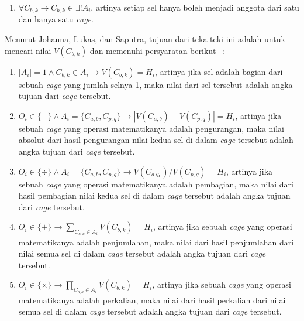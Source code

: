 \documentclass[a4paper,twoside]{article}
\begin{document}
\begin{enumerate}
\begin{enumerate}
\item \begin{math}\forall C_{b,k} \rightarrow C_{b,k} \in \exists! A_i\end{math}, artinya setiap sel hanya boleh menjadi anggota dari satu dan hanya satu \textit{cage}.
\end{enumerate}
Menurut Johanna, Lukas, dan Saputra, tujuan dari teka-teki ini adalah untuk mencari nilai \begin{math}V(C_{b,k})\end{math} dan memenuhi persyaratan berikut ~\cite{JohannaLukasSaputra}:
\begin{enumerate}
\item \begin{math}|A_i| = 1 \land C_{b,k} \in A_i \rightarrow V(C_{b,k}) = H_i\end{math}, artinya jika sel adalah bagian dari sebuah \textit{cage} yang jumlah selnya 1, maka nilai dari sel tersebut adalah angka tujuan dari \textit{cage} tersebut.
\item \begin{math}O_i \in \{-\} \land A_i = \{C_{a,b}, C_{p,q}\} \rightarrow |V(C_{a,b}) - V(C_{p,q})| = H_i\end{math}, artinya jika sebuah \textit{cage} yang operasi matematikanya adalah pengurangan, maka nilai absolut dari hasil pengurangan nilai kedua sel di dalam \textit{cage} tersebut adalah angka tujuan dari \textit{cage} tersebut.
\item \begin{math}O_i \in \{\div\} \land A_i = \{C_{a,b}, C_{p,q}\} \rightarrow V(C_a,_b) / V(C_{p,q}) = H_i\end{math}, artinya jika sebuah \textit{cage} yang operasi matematikanya adalah pembagian, maka nilai dari hasil pembagian nilai kedua sel di dalam \textit{cage} tersebut adalah angka tujuan dari \textit{cage} tersebut.
\item \begin{math}O_i \in \{+\} \rightarrow \sum_{C_{b,k} \in A_i} V(C_{b,k}) = H_i\end{math}, artinya jika sebuah \textit{cage} yang operasi matematikanya adalah penjumlahan, maka nilai dari hasil penjumlahan dari nilai semua sel di dalam \textit{cage} tersebut adalah angka tujuan dari \textit{cage} tersebut.
\item \begin{math}O_i \in \{\times\} \rightarrow \prod_{C_{b,k} \in A_i} V(C_{b,k}) = H_i\end{math}, artinya jika sebuah \textit{cage} yang operasi matematikanya adalah perkalian, maka nilai dari hasil perkalian dari nilai semua sel di dalam \textit{cage} tersebut adalah angka tujuan dari \textit{cage} tersebut.
\end{enumerate}
		

\end{enumerate}
\end{document}
